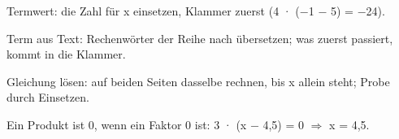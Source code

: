 \documentclass[11pt]{article}
\newcommand{\gkern}[1]{\par\addvspace{14pt}\Needspace*{6\baselineskip}\noindent{\bfseries Kern}\par\nobreak\smallskip
  {\small\raggedright #1\par}}
\begin{document}
\gkern{Termwert: die Zahl für x einsetzen, Klammer zuerst (4 · ($-$1 $-$ 5) = $-$24).\par\smallskip\noindent Term aus Text: Rechenwörter der Reihe nach übersetzen; was zuerst passiert, kommt in die Klammer.\par\smallskip\noindent Gleichung lösen: auf beiden Seiten dasselbe rechnen, bis x allein steht; Probe durch Einsetzen.\par\smallskip\noindent Ein Produkt ist 0, wenn ein Faktor 0 ist: 3 · (x $-$ 4,5) = 0 $\Rightarrow$ x = 4,5.}
\end{document}
